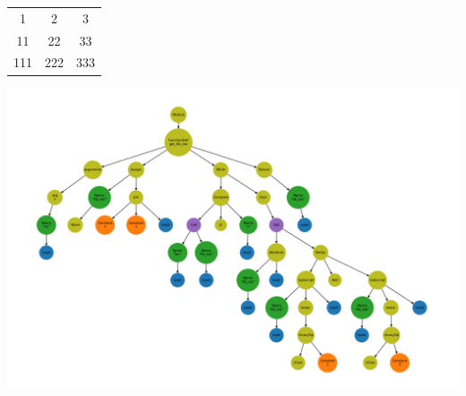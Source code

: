 \documentclass{article}
\begin{document}
\begin{tabular}{c|c|c}
\hline
1 & 2 & 3 \\
11 & 22 & 33 \\
111 & 222 & 333 \\
\hline
\end{tabular}
\includegraphics[width=\linewidth]{artifacts/ast.png}
\end{document}
